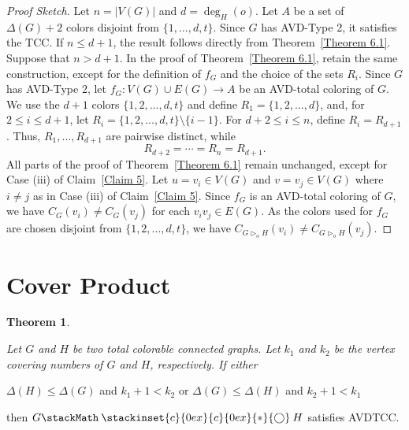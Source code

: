 \documentclass[12pt]{article}
\newcommand\oast{\stackMath\mathbin{\stackinset{c}{0ex}{c}{0ex}{\ast}{\bigcirc}}}
\theoremstyle{definition}
\newtheorem{thm}[defn]{Theorem}
\begin{document}
\begin{proof}[Proof Sketch]
Let $n=|V(G)|$ and $d=\deg_H(o)$. 
Let $A$ be a set of $\Delta(G)+2$ colors disjoint from $\{1,\ldots,d,t\}$.
Since $G$ has AVD-Type 2, it satisfies the TCC.
If $n\leq d+1$, the result follows directly from Theorem~\ref{Theorem 6.1}.
Suppose that $n>d+1$. In the proof of Theorem~\ref{Theorem 6.1}, retain the same construction, except for the definition of $f_G$ and the choice of the sets $R_i$.
Since $G$ has AVD-Type 2, let $f_G:V(G)\cup E(G)\rightarrow A$ be an AVD-total coloring of $G$. 
We use the $d+1$ colors
$\{1,2,\ldots,d,t\}$
and define
$R_1=\{1,2,\ldots,d\}$,
and, for $2\leq i\leq d+1$, let
$R_i=\{1,2,\ldots,d,t\}\setminus\{i-1\}$.
For $d+2\leq i\leq n$, define
$R_i=R_{d+1}$.
Thus, $R_1,\ldots,R_{d+1}$ are pairwise distinct, while
\[
R_{d+2}=\cdots=R_n=R_{d+1}.
\]
All parts of the proof of Theorem~\ref{Theorem 6.1} remain unchanged, except for Case (iii) of Claim~\ref{Claim 5}. Let $u=v_i \in V(G)$ and $v=v_j \in V(G)$ where $i\neq j$ as in Case (iii) of Claim~\ref{Claim 5}. 
Since $f_G$ is an AVD-total coloring of $G$, we have $C_G(v_i)\neq C_G(v_j)$ for each $v_iv_j\in E(G)$.
As the colors used for $f_G$ are chosen disjoint from $\{1,2,...,d,t\}$, we have
$
C_{G\triangleright_o H}(v_i)\neq
C_{G\triangleright_o H}(v_j).
$
\end{proof}


\section{Cover Product}

\begin{thm}\label{Theorem 7.1}
    {\em Let $G$ and $H$ be two total colorable connected graphs. Let $k_{1}$ and $k_{2}$ be the vertex covering
numbers of $G$ and $H$, respectively. If either 
\begin{center}
    $\Delta(H) \leq \Delta(G)$ and $k_{1}+1 < k_{2}$ or $\Delta(G) \leq \Delta(H)$ and
$k_{2}+1 < k_{1}$ 
\end{center}
then $G \oast H$ satisfies AVDTCC.}
\end{thm}
\end{document}
